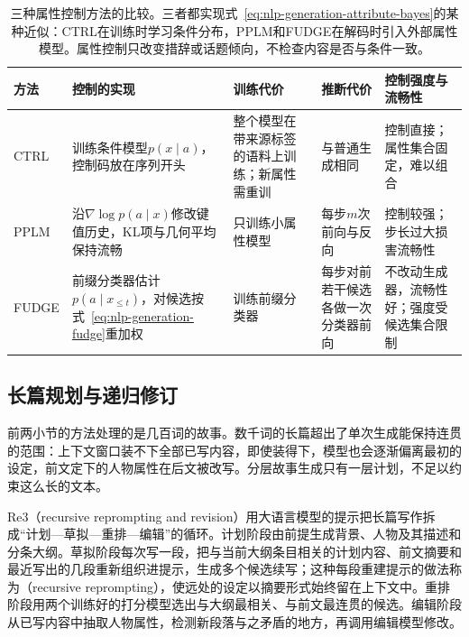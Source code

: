 \begin{table}[htbp]
  \centering
  \small
  \begin{tabularx}{\linewidth}{@{}>{\raggedright\arraybackslash}p{18mm}
    >{\raggedright\arraybackslash}X>{\raggedright\arraybackslash}X
    >{\raggedright\arraybackslash}X>{\raggedright\arraybackslash}X@{}}
    \toprule
    方法 & 控制的实现 & 训练代价 & 推断代价 & 控制强度与流畅性 \\
    \midrule
    CTRL & 训练条件模型$p(x\mid a)$，控制码放在序列开头 & 整个模型在带来源标签的语料上训练；新属性需重训 & 与普通生成相同 & 控制直接；属性集合固定，难以组合 \\
    PPLM & 沿$\nabla\log p(a\mid x)$修改键值历史，KL项与几何平均保持流畅 & 只训练小属性模型 & 每步$m$次前向与反向 & 控制较强；步长过大损害流畅性 \\
    FUDGE & 前缀分类器估计$p(a\mid x_{\le t})$，对候选按式~\eqref{eq:nlp-generation-fudge}重加权 & 训练前缀分类器 & 每步对前若干候选各做一次分类器前向 & 不改动生成器，流畅性好；强度受候选集合限制 \\
    \bottomrule
  \end{tabularx}
  \caption{三种属性控制方法的比较。三者都实现式~\eqref{eq:nlp-generation-attribute-bayes}的某种近似：CTRL在训练时学习条件分布，PPLM和FUDGE在解码时引入外部属性模型。属性控制只改变措辞或话题倾向，不检查内容是否与条件一致。}
  \label{tab:nlp-generation-attribute-control}
\end{table}

\subsection{长篇规划与递归修订}
\label{sec:nlp-generation-long-form}

前两小节的方法处理的是几百词的故事。数千词的长篇超出了单次生成能保持连贯的范围：上下文窗口装不下全部已写内容，即使装得下，模型也会逐渐偏离最初的设定，前文定下的人物属性在后文被改写。分层故事生成只有一层计划，不足以约束这么长的文本。

Re3（recursive reprompting and revision）用大语言模型的提示把长篇写作拆成“计划—草拟—重排—编辑”的循环。计划阶段由前提生成背景、人物及其描述和分条大纲。草拟阶段每次写一段，把与当前大纲条目相关的计划内容、前文摘要和最近写出的几段重新组织进提示，生成多个候选续写；这种每段重建提示的做法称为（recursive reprompting），使远处的设定以摘要形式始终留在上下文中。重排阶段用两个训练好的打分模型选出与大纲最相关、与前文最连贯的候选。编辑阶段从已写内容中抽取人物属性，检测新段落与之矛盾的地方，再调用编辑模型修改。

